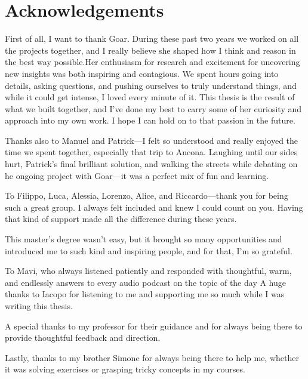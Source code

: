 \documentclass{report}
\begin{document}
\chapter{Acknowledgements} 

First of all, I want to thank Goar. During these past two years we worked on all the projects together, and I really believe she shaped how I think and reason in the best way possible.Her enthusiasm for research and excitement for uncovering new insights was both inspiring and contagious. We spent hours going into details, asking questions, and pushing ourselves to truly understand things, and while it could get intense, I loved every minute of it. This thesis is the result of what we built together, and I’ve done my best to carry some of her curiosity and approach into my own work. I hope I can hold on to that passion in the future.

Thanks also to Manuel and Patrick—I felt so understood and really enjoyed the time we spent together, especially that trip to Ancona. Laughing until our sides hurt, Patrick’s final brilliant solution, and walking the streets while debating on he ongoing project with Goar—it was a perfect mix of fun and learning.

To Filippo, Luca, Alessia, Lorenzo, Alice, and Riccardo—thank you for being such a great group. I always felt included and knew I could count on you. Having that kind of support made all the difference during these years.

This master’s degree wasn’t easy, but it brought so many opportunities and introduced me to such kind and inspiring people, and for that, I’m so grateful.

To Mavi, who always listened patiently and responded with thoughtful, warm, and endlessly answers to every audio podcast on the topic of the day
A huge thanks to Iacopo for listening to me and supporting me so much while I was writing this thesis.

A special thanks to my professor for their guidance and for always being there to provide thoughtful feedback and direction.

Lastly, thanks to my brother Simone for always being there to help me,  whether it was solving exercises or grasping tricky concepts in my courses.



\end{document}
